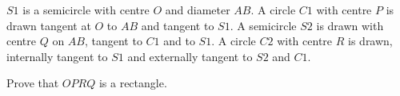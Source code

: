 \documentclass[varwidth]{standalone}
\begin{document}
    $S1$ is a semicircle with centre $O$ and diameter $AB$. A circle $C1$ with centre $P$ is drawn tangent at $O$ to $AB$ and tangent to $S1$. A semicircle $S2$ is drawn with centre $Q$ on $AB$, tangent to $C1$ and to $S1$. A circle $C2$ with centre $R$ is drawn, internally tangent to $S1$ and externally tangent to $S2$ and $C1$.

    Prove that $OPRQ$ is a rectangle.
\end{document}
